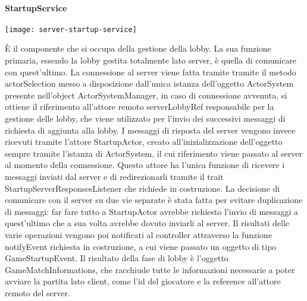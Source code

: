 \paragraph{StartupService}
\begin{center}
    \texttt{[image: server-startup-service]}
\end{center}
È il componente che si occupa della gestione della lobby.
La sua funzione primaria, essendo la lobby gestita totalmente lato server, è quella di comunicare con quest’ultimo.
La connessione al server viene fatta tramite tramite il metodo actorSelection messo a disposizione dall’unica istanza dell’oggetto ActorSystem presente nell’object ActorSystemManager, in caso di connessione avvenuta, si ottiene il riferimento all’attore remoto serverLobbyRef responsabile per la gestione delle lobby, che viene utilizzato per l’invio dei successivi messaggi di richiesta di aggiunta alla lobby.
I messaggi di risposta del server vengono invece ricevuti tramite l’attore StartupActor, creato all’inizializzazione dell’oggetto sempre tramite l’istanza di ActorSystem, il cui riferimento viene passato al server al momento della connessione.
Questo attore ha l’unica funzione di ricevere i messaggi inviati dal server e di redirezionarli tramite il trait StartupServerResponsesListener che richiede in costruzione.
La decisione di comunicare con il server su due vie separate è stata fatta per evitare duplicazione di messaggi: far fare tutto a StartupActor avrebbe richiesto l’invio di messaggi a quest’ultimo che a sua volta avrebbe dovuto inviarli al server.
Il risultati delle varie operazioni vengono poi notificati al controller attraverso la funzione notifyEvent richiesta in costruzione, a cui viene passato un oggetto di tipo GameStartupEvent.
Il risultato della fase di lobby è l’oggetto GameMatchInformations, che racchiude tutte le informazioni necessarie a poter avviare la partita lato client, come l'id del giocatore e la reference all'attore remoto del server.

